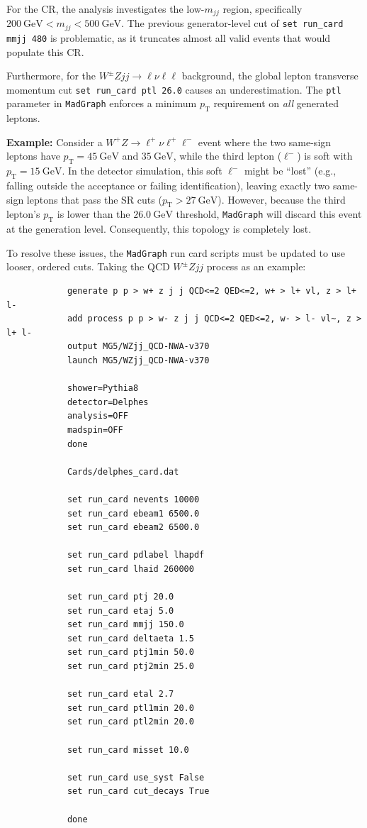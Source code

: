 \documentclass[12pt]{article}
\begin{document}
        For the CR, the analysis investigates the low-$m_{jj}$ region, specifically $200~\mathrm{GeV} < m_{jj} < 500~\mathrm{GeV}$. The previous generator-level cut of \verb|set run_card mmjj 480| is problematic, as it truncates almost all valid events that would populate this CR.

        Furthermore, for the $W^{\pm}Zjj \to \ell\nu\ell\ell$ background, the global lepton transverse momentum cut \verb|set run_card ptl 26.0| causes an underestimation. The \verb|ptl| parameter in \verb|MadGraph| enforces a minimum $p_{\text{T}}$ requirement on \textit{all} generated leptons.

        \textbf{Example:} Consider a $W^+Z \to \ell^+ \nu \ell^+ \ell^-$ event where the two same-sign leptons have $p_{\text{T}} = 45~\mathrm{GeV}$ and $35~\mathrm{GeV}$, while the third lepton ($\ell^-$) is soft with $p_{\text{T}} = 15~\mathrm{GeV}$. In the detector simulation, this soft $\ell^-$ might be ``lost'' (e.g., falling outside the acceptance or failing identification), leaving exactly two same-sign leptons that pass the SR cuts ($p_{\text{T}} > 27~\mathrm{GeV}$). However, because the third lepton's $p_{\text{T}}$ is lower than the $26.0~\mathrm{GeV}$ threshold, \verb|MadGraph| will discard this event at the generation level. Consequently, this topology is completely lost.

        To resolve these issues, the \verb|MadGraph| run card scripts must be updated to use looser, ordered cuts. Taking the QCD $W^{\pm}Zjj$ process as an example:

        \begin{lstlisting}
            generate p p > w+ z j j QCD<=2 QED<=2, w+ > l+ vl, z > l+ l-
            add process p p > w- z j j QCD<=2 QED<=2, w- > l- vl~, z > l+ l-
            output MG5/WZjj_QCD-NWA-v370
            launch MG5/WZjj_QCD-NWA-v370

            shower=Pythia8
            detector=Delphes
            analysis=OFF
            madspin=OFF
            done

            Cards/delphes_card.dat

            set run_card nevents 10000
            set run_card ebeam1 6500.0
            set run_card ebeam2 6500.0

            set run_card pdlabel lhapdf
            set run_card lhaid 260000

            set run_card ptj 20.0
            set run_card etaj 5.0
            set run_card mmjj 150.0
            set run_card deltaeta 1.5
            set run_card ptj1min 50.0
            set run_card ptj2min 25.0

            set run_card etal 2.7
            set run_card ptl1min 20.0
            set run_card ptl2min 20.0

            set run_card misset 10.0

            set run_card use_syst False
            set run_card cut_decays True

            done
        \end{lstlisting}
\end{document}
